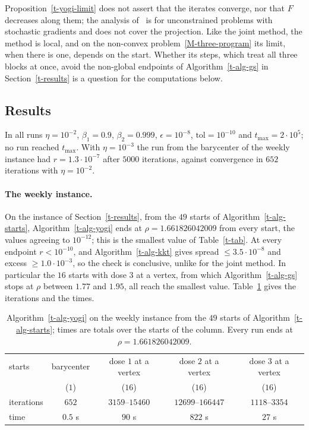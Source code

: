 \documentclass[11pt]{article}
\theoremstyle{plain}
\theoremstyle{remark}
\numberwithin{equation}{section}
\begin{document}
Proposition~\ref{t-yogi-limit} does not assert that the iterates converge, nor
that $F$ decreases along them; the analysis of~\cite{2018Zaheer_Yogi} is for
unconstrained problems with stochastic gradients and does not cover the
projection. Like the joint method, the method is local, and on the non-convex
problem~\eqref{M-three-program} its limit, when there is one, depends on the
start. Whether its steps, which treat all three blocks at once, avoid the
non-global endpoints of Algorithm~\ref{t-alg-gs} in Section~\ref{t-results} is
a question for the computations below.

\subsection{Results}\label{t-yogi-results}

In all runs $\eta=10^{-2}$, $\beta_1=0.9$, $\beta_2=0.999$,
$\epsilon=10^{-8}$, $\mathrm{tol}=10^{-10}$ and $t_{\max}=2\cdot 10^5$; no run
reached $t_{\max}$. With $\eta=10^{-3}$ the run from the barycenter of the
weekly instance had $r=1.3\cdot 10^{-7}$ after $5000$ iterations, against
convergence in $652$ iterations with $\eta=10^{-2}$.

\paragraph{The weekly instance.} On the instance of Section~\ref{t-results},
from the $49$ starts of Algorithm~\ref{t-alg-starts},
Algorithm~\ref{t-alg-yogi} ends at $\rho=1.661826042009$ from every start, the
values agreeing to $10^{-12}$; this is the smallest value of
Table~\ref{t-tab}. At every endpoint $r<10^{-10}$, and Algorithm~\ref{t-alg-kkt}
gives spread $\le 3.5\cdot 10^{-8}$ and excess $\ge 1.0\cdot 10^{-3}$, so the
check is conclusive, unlike for the joint method. In particular the $16$
starts with dose $3$ at a vertex, from which Algorithm~\ref{t-alg-gs} stops
at $\rho$ between $1.77$ and $1.95$, all reach the smallest value.
Table~\ref{t-tab-yogi} gives the iterations and the times.

\begin{table}[ht]
\centering
\small
\begin{tabular}{lcccc}
\hline
starts & barycenter & dose $1$ at a vertex & dose $2$ at a vertex & dose $3$ at a vertex\\
 & ($1$) & ($16$) & ($16$) & ($16$)\\
\hline
iterations & $652$ & $3159$--$15460$ & $12699$--$166447$ & $1118$--$3354$\\
time & $0.5$ s & $90$ s & $822$ s & $27$ s\\
\hline
\end{tabular}
\caption{Algorithm~\ref{t-alg-yogi} on the weekly instance from the $49$ starts
of Algorithm~\ref{t-alg-starts}; times are totals over the starts of the
column. Every run ends at $\rho=1.661826042009$.}\label{t-tab-yogi}
\end{table}
\end{document}
